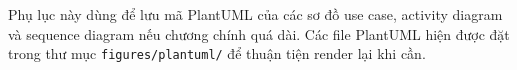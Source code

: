 \documentclass[../DoAn.tex]{subfiles}
\begin{document}
Phụ lục này dùng để lưu mã PlantUML của các sơ đồ use case, activity diagram và sequence diagram nếu chương chính quá dài. Các file PlantUML hiện được đặt trong thư mục \texttt{figures/plantuml/} để thuận tiện render lại khi cần.
\end{document}
